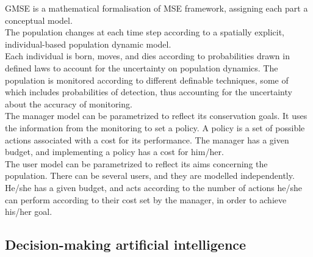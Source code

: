 \documentclass[12pt,a4paper]{article}
\begin{document}
GMSE is a mathematical formalisation of MSE framework, assigning each part a conceptual model.\\
The population changes at each time step according to a spatially explicit, individual-based population dynamic model.\\
Each individual is born, moves, and dies according to probabilities drawn in defined laws to account for the uncertainty on population dynamics.
The population is monitored according to different definable techniques, some of which includes probabilities of detection, thus accounting for the uncertainty about the accuracy of monitoring.\\
The manager model can be parametrized to reflect its conservation goals.
It uses the information from the monitoring to set a policy.
A policy is a set of possible actions associated with a cost for its performance.
The manager has a given budget, and implementing a policy has a cost for him/her.\\
The user model can be parametrized to reflect its aims concerning the population.
There can be several users, and they are modelled independently.
He/she has a given budget, and acts according to the number of actions he/she can perform according to their cost set by the manager, in order to achieve his/her goal.
%

\subsection{Decision-making artificial intelligence}
\end{document}
